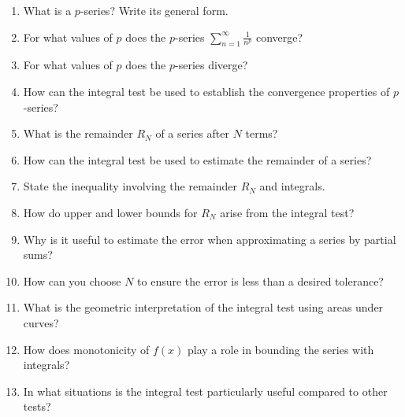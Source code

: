 \begin{enumerate}
  \item What is a $p$-series? Write its general form.
  \item For what values of $p$ does the $p$-series $\sum_{n=1}^{\infty} \frac{1}{n^p}$ converge?
  \item For what values of $p$ does the $p$-series diverge?
  \item How can the integral test be used to establish the convergence properties of $p$-series?
  \item What is the remainder $R_N$ of a series after $N$ terms?
  \item How can the integral test be used to estimate the remainder of a series?
  \item State the inequality involving the remainder $R_N$ and integrals.
  \item How do upper and lower bounds for $R_N$ arise from the integral test?
  \item Why is it useful to estimate the error when approximating a series by partial sums?
  \item How can you choose $N$ to ensure the error is less than a desired tolerance?
  \item What is the geometric interpretation of the integral test using areas under curves?
  \item How does monotonicity of $f(x)$ play a role in bounding the series with integrals?
  \item In what situations is the integral test particularly useful compared to other tests?
\end{enumerate}
